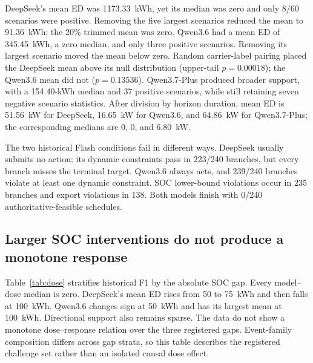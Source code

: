 \documentclass[11pt]{article}
\newcommand{\DeepMeanED}{1173.33}
\newcommand{\QwenMeanED}{345.45}
\begin{document}
DeepSeek's mean ED was \DeepMeanED{}~kWh, yet its median was zero and only 8/60 scenarios were
positive. Removing the five largest scenarios reduced the mean to 91.36~kWh; the 20\% trimmed mean
was zero. Qwen3.6 had a mean ED of \QwenMeanED{}~kWh, a zero median, and only three positive
scenarios. Removing its largest scenario moved the mean below zero. Random carrier-label pairing
placed the DeepSeek mean above its null distribution (upper-tail $p=0.00018$); the Qwen3.6 mean did
not ($p=0.13536$). Qwen3.7-Plus produced broader support, with a 154.40-kWh median and 37 positive
scenarios, while still retaining seven negative scenario statistics. After division by horizon
duration, mean ED is 51.56~kW for DeepSeek, 16.65~kW for Qwen3.6, and 64.86~kW for Qwen3.7-Plus;
the corresponding medians are 0, 0, and 6.80~kW.

The two historical Flash conditions fail in different ways. DeepSeek usually submits no action;
its dynamic constraints pass in 223/240 branches, but every branch misses the terminal target.
Qwen3.6 always acts, and 239/240 branches violate at least one dynamic constraint. SOC lower-bound
violations occur in 235 branches and export violations in 138. Both models finish with
0/240 authoritative-feasible schedules.

\subsection{Larger SOC interventions do not produce a monotone response}

Table~\ref{tab:dose} stratifies historical F1 by the absolute SOC gap. Every model--dose median is
zero. DeepSeek's mean ED rises from 50 to 75~kWh and then falls at 100~kWh. Qwen3.6 changes sign at
50~kWh and has its largest mean at 100~kWh. Directional support also remains sparse. The data do
not show a monotone dose--response relation over the three registered gaps. Event-family
composition differs across gap strata, so this table describes the registered challenge set rather
than an isolated causal dose effect.
\end{document}
